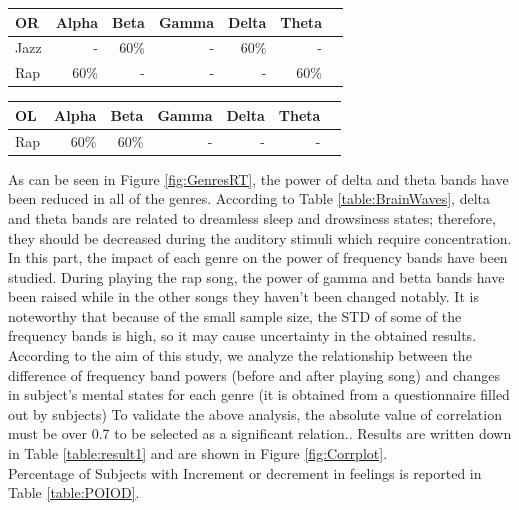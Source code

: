 \documentclass[9pt,twocolumn]{paper-template}
\begin{document}
\begin{table}[h!]
\begin{tabular}{lrrrrrr}
\textbf{OR} & Alpha & Beta & Gamma & Delta & Theta \\
\midrule
Jazz & - & 60\% & - & 60\% & - \\
Rap & 60\% & - & - & - & 60\% \\
\bottomrule
\end{tabular}

\begin{tabular}{lrrrrrr}
\textbf{OL} & Alpha & Beta & Gamma & Delta & Theta \\
\midrule
Rap & 60\% & 60\% & - & - & - \\
\bottomrule
\end{tabular}

\end{table}

As can be seen in Figure \ref{fig:GenresRT}, the power of delta and theta bands have been reduced in all of the genres. According to Table \ref{table:BrainWaves}, delta and theta bands are related to dreamless sleep and drowsiness states; therefore, they should be decreased during the auditory stimuli which require concentration. 
In this part, the impact of each genre on the power of frequency bands have been studied.
 During playing the rap song, the power of gamma and betta bands have been raised while in the other songs they haven’t been changed notably. It is noteworthy that because of the small sample size, the STD of some of the frequency bands is high, so it may cause uncertainty in the obtained results. \\


According to the aim of this study, we analyze the relationship between the difference of frequency band powers (before and after playing song) and changes in subject’s mental states for each genre (it is obtained from a questionnaire filled out by subjects) To validate the above analysis, the absolute value of correlation must be over 0.7 to be selected as a significant relation.\cite{Sedghizadeh2020}. Results are written down in Table \ref{table:result1} and are shown in Figure \ref{fig:Corrplot}.\\

Percentage of Subjects with Increment or decrement in feelings is reported in Table \ref{table:POIOD}.\\
\end{document}
